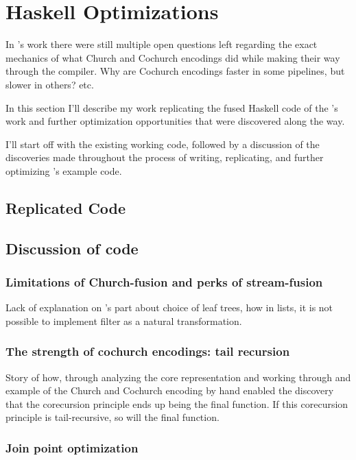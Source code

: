 
\section{Haskell Optimizations}\label{sec:haskell}
In \cite{Harper2011}'s work there were still multiple open questions left regarding the exact mechanics of what Church and Cochurch encodings did while making their way through the compiler. Why are Cochurch encodings faster in some pipelines, but slower in others? etc.

In this section I'll describe my work replicating the fused Haskell code of the \cite{Harper2011}'s work and further optimization opportunities that were discovered along the way.

I'll start off with the existing working code, followed by a discussion of the discoveries made throughout the process of writing, replicating, and further optimizing \cite{Harper2011}'s example code.

\subsection{Replicated Code}


\subsection{Discussion of code}
\subsubsection{Limitations of Church-fusion and perks of stream-fusion}\label{sec:tail}
Lack of explanation on \cite{Harper2011}'s part about choice of leaf trees, how in lists, it is not possible to implement filter as a natural transformation.
\subsubsection{The strength of cochurch encodings: tail recursion}
Story of how, through analyzing the core representation and working through and example of the Church and Cochurch encoding by hand enabled the discovery that the corecursion principle ends up being the final function.
If this corecursion principle is tail-recursive, so will the final function.
\subsubsection{Join point optimization}\label{sec:join}



\iffalse
One question that comes up is: Yes this fusion is nice, but how does the fused code actually provide a speedup, isn't the language already lazy and therefore not ripe for such a speedup? What are Haskell's other optimizations that come into play that pushes the shortcut fusion over the finish as a fast optimization?
\fi




